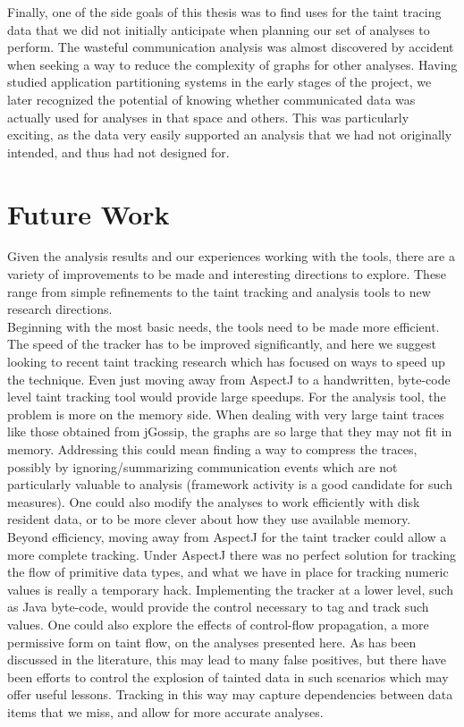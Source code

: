 \documentclass[msc,oneside]{ubcthesis}
\begin{document}
Finally, one of the side goals of this thesis was to find uses for the taint tracing data that we did not initially anticipate when planning our set of analyses to perform. The wasteful communication analysis was almost discovered by accident when seeking a way to reduce the complexity of graphs for other analyses. Having studied application partitioning systems in the early stages of the project, we later recognized the potential of knowing whether communicated data was actually used for analyses in that space and others. This was particularly exciting, as the data very easily supported an analysis that we had not originally intended, and thus had not designed for.

\section{Future Work}

Given the analysis results and our experiences working with the tools, there are a variety of improvements to be made and interesting directions to explore. These range from simple refinements to the taint tracking and analysis tools to new research directions.\\

Beginning with the most basic needs, the tools need to be made more efficient. The speed of the tracker has to be improved significantly, and here we suggest looking to recent taint tracking research which has focused on ways to speed up the technique. Even just moving away from AspectJ to a handwritten, byte-code level taint tracking tool would provide large speedups. For the analysis tool, the problem is more on the memory side. When dealing with very large taint traces like those obtained from jGossip, the graphs are so large that they may not fit in memory. Addressing this could mean finding a way to compress the traces, possibly by ignoring/summarizing communication events which are not particularly valuable to analysis (framework activity is a good candidate for such measures). One could also modify the analyses to work efficiently with disk resident data, or to be more clever about how they use available memory.\\

Beyond efficiency, moving away from AspectJ for the taint tracker could allow a more complete tracking. Under AspectJ there was no perfect solution for tracking the flow of primitive data types, and what we have in place for tracking numeric values is really a temporary hack. Implementing the tracker at a lower level, such as Java byte-code, would provide the control necessary to tag and track such values. One could also explore the effects of control-flow propagation, a more permissive form on taint flow, on the analyses presented here. As has been discussed in the literature, this may lead to many false positives, but there have been efforts to control the explosion of tainted data in such scenarios which may offer useful lessons. Tracking in this way may capture dependencies between data items that we miss, and allow for more accurate analyses.\\
\end{document}
